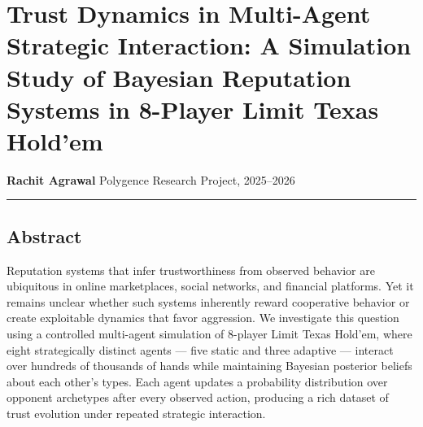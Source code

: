 \documentclass[
]{article}
\author{}
\date{}
\begin{document}
\hypertarget{trust-dynamics-in-multi-agent-strategic-interaction-a-simulation-study-of-bayesian-reputation-systems-in-8-player-limit-texas-holdem}{%
\section{Trust Dynamics in Multi-Agent Strategic Interaction: A
Simulation Study of Bayesian Reputation Systems in 8-Player Limit Texas
Hold'em}\label{trust-dynamics-in-multi-agent-strategic-interaction-a-simulation-study-of-bayesian-reputation-systems-in-8-player-limit-texas-holdem}}

\textbf{Rachit Agrawal} Polygence Research Project, 2025--2026

\begin{center}\rule{0.5\linewidth}{0.5pt}\end{center}

\hypertarget{abstract}{%
\subsection{Abstract}\label{abstract}}

Reputation systems that infer trustworthiness from observed behavior are
ubiquitous in online marketplaces, social networks, and financial
platforms. Yet it remains unclear whether such systems inherently reward
cooperative behavior or create exploitable dynamics that favor
aggression. We investigate this question using a controlled multi-agent
simulation of 8-player Limit Texas Hold'em, where eight strategically
distinct agents --- five static and three adaptive --- interact over
hundreds of thousands of hands while maintaining Bayesian posterior
beliefs about each other's types. Each agent updates a probability
distribution over opponent archetypes after every observed action,
producing a rich dataset of trust evolution under repeated strategic
interaction.
\end{document}
